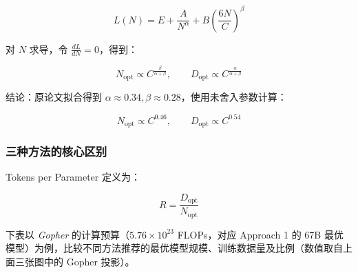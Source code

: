 \documentclass[
  11pt,
  a4paper,
  fontset=none]{ctexart}
\newenvironment{NotesFormula}{%
  \par\noindent\begin{minipage}{\linewidth}%
  \setlength{\parindent}{2em}%
  \setlength{\parskip}{0.35em}%
}{\end{minipage}\par}
\begin{document}
\[L(N)=E+\frac{A}{N^\alpha}+B\left(\frac{6N}{C}\right)^\beta\]

\begin{NotesFormula}

对 \(N\) 求导，令 \(\frac{dL}{dN}=0\)，得到：

\[N_{\mathrm{opt}}\propto C^{\frac{\beta}{\alpha+\beta}},\qquad
D_{\mathrm{opt}}\propto C^{\frac{\alpha}{\alpha+\beta}}\]

\end{NotesFormula}

\begin{NotesFormula}

结论：原论文拟合得到
\(\alpha\approx0.34,\beta\approx0.28\)，使用未舍入参数计算：

\[\boxed{N_{\mathrm{opt}}\propto C^{0.46},\qquad D_{\mathrm{opt}}\propto C^{0.54}}\]

\end{NotesFormula}

\subsubsection{三种方法的核心区别}\label{ux4e09ux79cdux65b9ux6cd5ux7684ux6838ux5fc3ux533aux522b}

\begin{NotesFormula}

Tokens per Parameter 定义为：

\[\boxed{R=\frac{D_{\mathrm{opt}}}{N_{\mathrm{opt}}}}\]

\end{NotesFormula}

下表以 \emph{Gopher} 的计算预算（\(5.76\times10^{23}\) FLOPs，对应
Approach 1 的 67B
最优模型）为例，比较不同方法推荐的最优模型规模、训练数据量及比例（数值取自上面三张图中的
Gopher 投影）。
\end{document}
